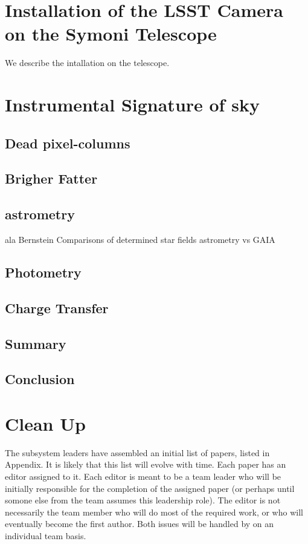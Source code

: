 \section{Installation of the LSST Camera on the Symoni Telescope}

We describe the intallation on the telescope.

\section{Instrumental Signature of sky}
\subsection{Dead pixel-columns}
\subsection{Brigher Fatter}
\subsection{astrometry}
ala Bernstein
Comparisons of determined star fields astrometry vs GAIA
\subsection{Photometry}
\subsection{Charge Transfer}
\subsection{Summary}
\subsection{Conclusion}


\section{Clean Up}



The subsystem leaders have assembled an initial list of papers, listed in Appendix. 
It is likely that this list will evolve with time. 
Each paper has an editor assigned to it. Each editor is meant to be a team leader
who will be initially responsible for the completion of the assigned paper (or perhaps 
until somone else from the team assumes this leadership role). The editor is not 
necessarily the team member who will do most of the required work, or who will 
eventually become the first author. Both issues will be handled by on an individual team basis. 

